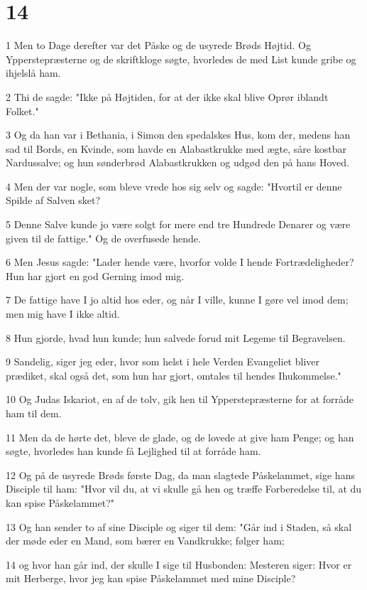 \chapter{14}

\par 1 Men to Dage derefter var det Påske og de usyrede Brøds Højtid. Og Ypperstepræsterne og de skriftkloge søgte, hvorledes de med List kunde gribe og ihjelslå ham.
\par 2 Thi de sagde: "Ikke på Højtiden, for at der ikke skal blive Oprør iblandt Folket."
\par 3 Og da han var i Bethania, i Simon den spedalskes Hus, kom der, medens han sad til Bords, en Kvinde, som havde en Alabastkrukke med ægte, såre kostbar Nardussalve; og hun sønderbrød Alabastkrukken og udgød den på hans Hoved.
\par 4 Men der var nogle, som bleve vrede hos sig selv og sagde: "Hvortil er denne Spilde af Salven sket?
\par 5 Denne Salve kunde jo være solgt for mere end tre Hundrede Denarer og være given til de fattige." Og de overfusede hende.
\par 6 Men Jesus sagde: "Lader hende være, hvorfor volde I hende Fortrædeligheder? Hun har gjort en god Gerning imod mig.
\par 7 De fattige have I jo altid hos eder, og når I ville, kunne I gøre vel imod dem; men mig have I ikke altid.
\par 8 Hun gjorde, hvad hun kunde; hun salvede forud mit Legeme til Begravelsen.
\par 9 Sandelig, siger jeg eder, hvor som helst i hele Verden Evangeliet bliver prædiket, skal også det, som hun har gjort, omtales til hendes Ihukommelse."
\par 10 Og Judas Iskariot, en af de tolv, gik hen til Ypperstepræsterne for at forråde ham til dem.
\par 11 Men da de hørte det, bleve de glade, og de lovede at give ham Penge; og han søgte, hvorledes han kunde få Lejlighed til at forråde ham.
\par 12 Og på de usyrede Brøds første Dag, da man slagtede Påskelammet, sige hans Disciple til ham: "Hvor vil du, at vi skulle gå hen og træffe Forberedelse til, at du kan spise Påskelammet?"
\par 13 Og han sender to af sine Disciple og siger til dem: "Går ind i Staden, så skal der møde eder en Mand, som bærer en Vandkrukke; følger ham;
\par 14 og hvor han går ind, der skulle I sige til Husbonden: Mesteren siger: Hvor er mit Herberge, hvor jeg kan spise Påskelammet med mine Disciple?

